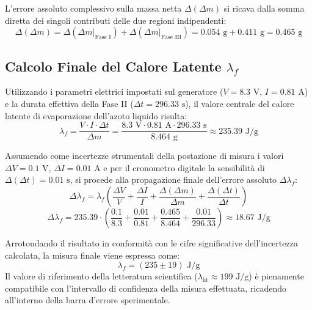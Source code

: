 \documentclass[a4paper,12pt]{article}
\begin{document}
L'errore assoluto complessivo sulla massa netta $\Delta(\Delta m)$ si ricava dalla somma diretta dei singoli contributi delle due regioni indipendenti:
\begin{equation*}
\Delta(\Delta m) = \Delta(\Delta m|_{\text{Fase I}}) + \Delta(\Delta m|_{\text{Fase III}}) = 0.054\text{ g} + 0.411\text{ g} = 0.465\text{ g}
\end{equation*}

\subsection{Calcolo Finale del Calore Latente $\lambda_f$}
Utilizzando i parametri elettrici impostati sul generatore ($V = 8.3\text{ V}$, $I = 0.81\text{ A}$) e la durata effettiva della Fase II ($\Delta t = 296.33\text{ s}$), il valore centrale del calore latente di evaporazione dell'azoto liquido risulta:
\begin{equation*}
\lambda_f = \frac{V \cdot I \cdot \Delta t}{\Delta m} = \frac{8.3\text{ V} \cdot 0.81\text{ A} \cdot 296.33\text{ s}}{8.464\text{ g}} \approx 235.39\text{ J/g}
\end{equation*}

Assumendo come incertezze strumentali della postazione di misura i valori $\Delta V = 0.1\text{ V}$, $\Delta I = 0.01\text{ A}$ e per il cronometro digitale la sensibilità di $\Delta(\Delta t) = 0.01\text{ s}$, si procede alla propagazione finale dell'errore assoluto $\Delta \lambda_f$:
\begin{equation*}
\Delta \lambda_f = \lambda_f \left( \frac{\Delta V}{V} + \frac{\Delta I}{I} + \frac{\Delta(\Delta m)}{\Delta m} + \frac{\Delta(\Delta t)}{\Delta t} \right)
\end{equation*}
\begin{equation*}
\Delta \lambda_f = 235.39 \cdot \left( \frac{0.1}{8.3} + \frac{0.01}{0.81} + \frac{0.465}{8.464} + \frac{0.01}{296.33} \right) \approx 18.67\text{ J/g}
\end{equation*}

Arrotondando il risultato in conformità con le cifre significative dell'incertezza calcolata, la misura finale viene espressa come:
\begin{equation*}
\lambda_f = (235 \pm 19)\text{ J/g}
\end{equation*}
Il valore di riferimento della letteratura scientifica ($\lambda_{\text{lit}} \approx 199\text{ J/g}$) è pienamente compatibile con l'intervallo di confidenza della misura effettuata, ricadendo all'interno della barra d'errore sperimentale.
\end{document}
